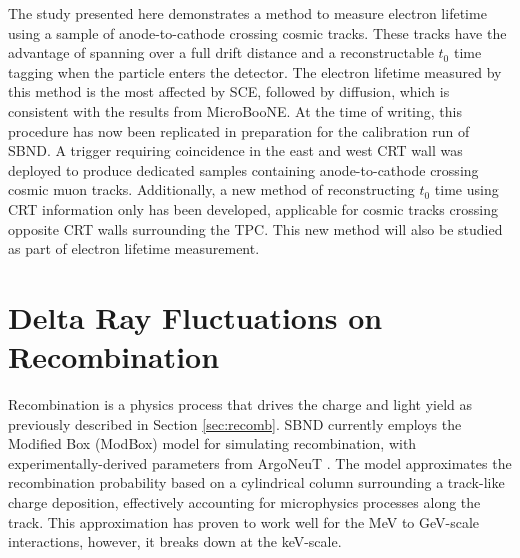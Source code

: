 The study presented here demonstrates a method to measure electron lifetime using a sample of anode-to-cathode crossing cosmic tracks.
These tracks have the advantage of spanning over a full drift distance and a reconstructable $t_{0}$ time tagging when the particle enters the detector.
The electron lifetime measured by this method is the most affected by SCE, followed by diffusion, which is consistent with the results from MicroBooNE.
At the time of writing, this procedure has now been replicated in preparation for the calibration run of SBND.
A trigger requiring coincidence in the east and west CRT wall was deployed to produce dedicated samples containing anode-to-cathode crossing cosmic muon tracks.
Additionally, a new method of reconstructing $t_0$ time using CRT information only has been developed, applicable for cosmic tracks crossing opposite CRT walls surrounding the TPC.
This new method will also be studied as part of electron lifetime measurement.  


\section{Delta Ray Fluctuations on Recombination}
\label{sec7:delta}


Recombination is a physics process that drives the charge and light yield as previously described in Section \ref{sec:recomb}.
SBND currently employs the Modified Box (ModBox) model for simulating recombination, with experimentally-derived parameters from ArgoNeuT \cite{argoneut_recomb}.
The model approximates the recombination probability based on a cylindrical column surrounding a track-like charge deposition, effectively accounting for microphysics processes along the track.
This approximation has proven to work well for the MeV to GeV-scale interactions, however, it breaks down at the keV-scale.


